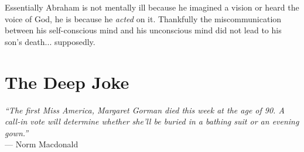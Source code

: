 Essentially Abraham is not mentally ill because he imagined a vision or heard the voice of God, he is because he \textit{acted} on it. Thankfully the miscommunication between his self-conscious mind and his unconscious mind did not lead to his son's death... supposedly.

\newpage
\section{The Deep Joke}



\begin{center}
    \textit{``The first Miss America, Margaret Gorman died this week at the age of 90. A call-in vote will determine whether she'll be buried in a bathing suit or an evening gown.''}
    \\ --- Norm Macdonald
\end{center}



